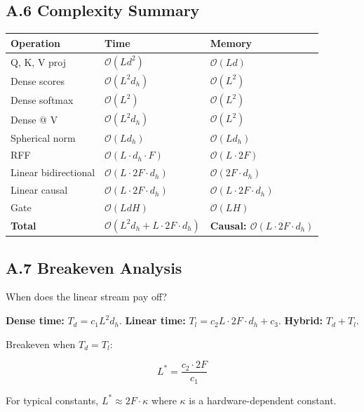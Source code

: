 \subsection{A.6 Complexity Summary}

\begin{table}[H]
\centering
\small
\begin{tabular}{lll}
\toprule
\textbf{Operation} & \textbf{Time} & \textbf{Memory} \\
\midrule
Q, K, V proj & $\mathcal{O}(L d^2)$ & $\mathcal{O}(L d)$ \\
Dense scores & $\mathcal{O}(L^2 d_h)$ & $\mathcal{O}(L^2)$ \\
Dense softmax & $\mathcal{O}(L^2)$ & $\mathcal{O}(L^2)$ \\
Dense @ V & $\mathcal{O}(L^2 d_h)$ & $\mathcal{O}(L^2)$ \\
Spherical norm & $\mathcal{O}(L d_h)$ & $\mathcal{O}(L d_h)$ \\
RFF & $\mathcal{O}(L \cdot d_h \cdot F)$ & $\mathcal{O}(L \cdot 2F)$ \\
Linear bidirectional & $\mathcal{O}(L \cdot 2F \cdot d_h)$ & $\mathcal{O}(2F \cdot d_h)$ \\
Linear causal & $\mathcal{O}(L \cdot 2F \cdot d_h)$ & $\mathcal{O}(L \cdot 2F \cdot d_h)$ \\
Gate & $\mathcal{O}(L d H)$ & $\mathcal{O}(L H)$ \\
\textbf{Total} & \textbf{$\mathcal{O}(L^2 d_h + L \cdot 2F \cdot d_h)$} & \textbf{Causal: $\mathcal{O}(L \cdot 2F \cdot d_h)$} \\
\bottomrule
\end{tabular}
\end{table}

\subsection{A.7 Breakeven Analysis}

When does the linear stream pay off?

\textbf{Dense time:} $T_d = c_1 L^2 d_h$.
\textbf{Linear time:} $T_l = c_2 L \cdot 2F \cdot d_h + c_3$.
\textbf{Hybrid:} $T_d + T_l$.

Breakeven when $T_d = T_l$:

\begin{equation}
L^* = \frac{c_2 \cdot 2F}{c_1}
\end{equation}

For typical constants, $L^* \approx 2F \cdot \kappa$ where $\kappa$ is a 
hardware-dependent constant.


